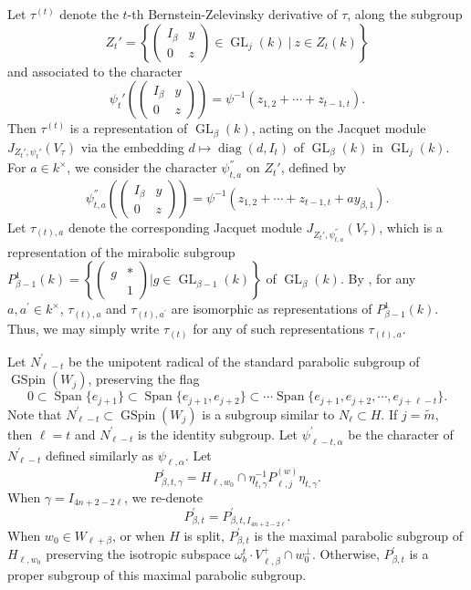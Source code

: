 \documentclass[12pt]{amsart}
\newcommand{\wt}{\widetilde}
\newcommand{\Span}{\operatorname{Span}}
\theoremstyle{remark}
\DeclareMathOperator{\diag}{diag}
\DeclareMathOperator{\GL}{GL}
\DeclareMathOperator{\GSpin}{GSpin}
\begin{document}
 
Let $\tau^{(t)}$ denote the $t$-th Bernstein-Zelevinsky derivative \cite{BernsteinZelevinsky1976} of $\tau$, along
the subgroup
$$
Z_t'=\left\{\begin{pmatrix}
               I_{\beta}&y\\0&z
                          \end{pmatrix}
\in \GL_j(k)\ \big|\ z\in Z_t(k)\right\}
$$
and associated to the character
$$
\psi_t'\left(
\begin{pmatrix}
I_\beta &y\\0&z
\end{pmatrix}
\right)=\psi^{-1}(z_{1,2}+\cdots+z_{t-1,t}).
$$
Then $\tau^{(t)}$ is a representation of $\GL_\beta(k)$, acting on the Jacquet module $J_{Z_t',\psi_t'}(V_\tau)$ via
the embedding $d\mapsto \diag(d,I_t)$ of $\GL_\beta(k)$ in $\GL_j(k)$. 
For $a\in k^\times$, we consider the character 
$\psi_{t,a}^{''}$ on $Z_t'$, defined by
$$
\psi_{t,a}^{''}\left(
\begin{pmatrix}
 I_\beta &y\\0&z
\end{pmatrix}\right)=\psi^{-1}(z_{1,2}+\cdots+z_{t-1,t}+ay_{\beta,1}).
$$
Let $\tau_{(t),a}$ denote the corresponding Jacquet module $J_{Z_t',\psi_{t,a}^{''}}(V_\tau)$, which is a
representation of the mirabolic subgroup $P_{\beta-1}^1(k)=\left\{ \left(\begin{smallmatrix} g&*\\&1\end{smallmatrix}\right)| g\in \GL_{\beta-1}(k) \right\}$ of $\GL_\beta(k)$. 
By \cite[Lemma 5.2]{GinzburgRallisSoudry2011}, for any $a, a^\prime\in k^\times$, $\tau_{(t),a}$ and $\tau_{(t),a^\prime}$ are isomorphic as representations of $P_{\beta-1}^1(k)$. Thus, we may simply write $\tau_{(t)}$ for any of such representations $\tau_{(t),a}$.


Let $N_{\ell-t}^\prime$ be the unipotent radical of the standard parabolic subgroup of $\GSpin(W_{j})$, preserving the flag
\begin{equation*}
0\subset \Span\{e_{j+1}\} \subset \Span\{e_{j+1}, e_{j+2}\} \subset \cdots \Span\{e_{j+1}, e_{j+2}, \cdots, e_{j+\ell-t}\}.	
\end{equation*}
Note that $N^\prime_{\ell-t}\subset \GSpin(W_j)$ is a subgroup similar to $N_{\ell}\subset H$. 
If $j=\wt m$, then $\ell=t$ and $N_{\ell-t}^\prime$ is the identity subgroup. 
Let $\psi_{\ell-t, \alpha}^\prime$ be the character of $N_{\ell-t}^\prime$ defined similarly as $\psi_{\ell,\alpha}$.
Let
\begin{equation*}
P_{\beta,t,\gamma}^\prime=H_{\ell,w_0}\cap \eta	_{t,\gamma}^{-1} P_{\ell,j}^{(w)} \eta_{t,\gamma}.
\end{equation*}
When $\gamma=I_{4n+2-2\ell}$, we re-denote
\begin{equation}
\label{eq-P_beta_t^prime}
P_{\beta,t}^\prime=P_{\beta,t,I_{4n+2-2\ell}}^\prime.
\end{equation}
When $w_0\in W_{\ell+\beta}$, or when $H$ is split, $P_{\beta,t}^\prime$ is the maximal parabolic subgroup of $H_{\ell,w_0}$ preserving the isotropic subspace $\omega_b^{t}\cdot V_{\ell,\beta}^+\cap w_0^\perp$. Otherwise, $P_{\beta,t}^\prime$ is a proper subgroup of this maximal parabolic subgroup.
\end{document}
